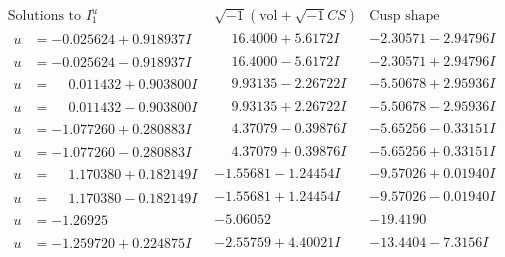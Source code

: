 \documentclass[1p]{elsarticle_modified}
\theoremstyle{definition}
\newcommand{\I}{\sqrt{-1}}
\begin{document}
$$\begin{array}{c|c|c}  
\text{Solutions to }I^u_{1}& \I (\text{vol} + \sqrt{-1}CS) & \text{Cusp shape}\\
 \hline 
\begin{aligned}
u &= -0.025624 + 0.918937 I\end{aligned}
 & \phantom{-}16.4000 + 5.6172 I & -2.30571 - 2.94796 I \\ \hline\begin{aligned}
u &= -0.025624 - 0.918937 I\end{aligned}
 & \phantom{-}16.4000 - 5.6172 I & -2.30571 + 2.94796 I \\ \hline\begin{aligned}
u &= \phantom{-}0.011432 + 0.903800 I\end{aligned}
 & \phantom{-}9.93135 - 2.26722 I & -5.50678 + 2.95936 I \\ \hline\begin{aligned}
u &= \phantom{-}0.011432 - 0.903800 I\end{aligned}
 & \phantom{-}9.93135 + 2.26722 I & -5.50678 - 2.95936 I \\ \hline\begin{aligned}
u &= -1.077260 + 0.280883 I\end{aligned}
 & \phantom{-}4.37079 - 0.39876 I & -5.65256 - 0.33151 I \\ \hline\begin{aligned}
u &= -1.077260 - 0.280883 I\end{aligned}
 & \phantom{-}4.37079 + 0.39876 I & -5.65256 + 0.33151 I \\ \hline\begin{aligned}
u &= \phantom{-}1.170380 + 0.182149 I\end{aligned}
 & -1.55681 - 1.24454 I & -9.57026 + 0.01940 I \\ \hline\begin{aligned}
u &= \phantom{-}1.170380 - 0.182149 I\end{aligned}
 & -1.55681 + 1.24454 I & -9.57026 - 0.01940 I \\ \hline\begin{aligned}
u &= -1.26925\phantom{ +0.000000I}\end{aligned}
 & -5.06052\phantom{ +0.000000I} & -19.4190\phantom{ +0.000000I} \\ \hline\begin{aligned}
u &= -1.259720 + 0.224875 I\end{aligned}
 & -2.55759 + 4.40021 I & -13.4404 - 7.3156 I \\ \hline\begin{aligned}

\end{aligned}
\end{array}$$
\end{document}
